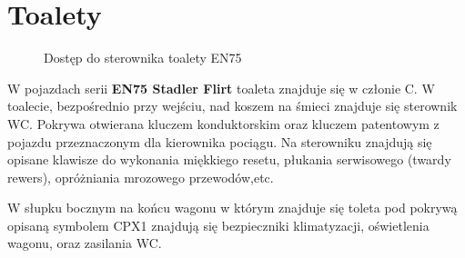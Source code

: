 \section{Toalety}
	\begin{figure}
	\caption{Dostęp do sterownika toalety EN75}
\end{figure}
	W pojazdach serii \textbf{EN75 Stadler Flirt} toaleta znajduje się w członie C. W toalecie, bezpośrednio przy wejściu, nad koszem na śmieci znajduje się sterownik WC. Pokrywa otwierana kluczem konduktorskim oraz kluczem patentowym z pojazdu przeznaczonym dla kierownika pociągu. Na sterowniku znajdują się opisane klawisze do wykonania miękkiego resetu, płukania serwisowego (twardy rewers), opróżniania mrozowego przewodów,etc.

W słupku bocznym na końcu wagonu w którym znajduje się toleta pod pokrywą opisaną symbolem CPX1 znajdują się bezpieczniki klimatyzacji, oświetlenia wagonu, oraz zasilania WC.

